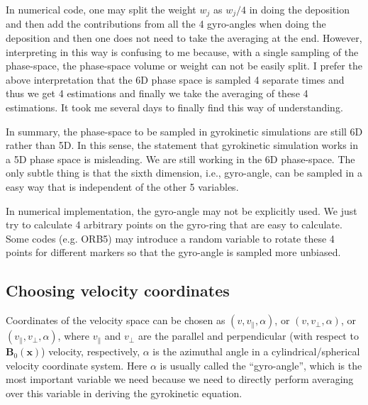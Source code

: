 \documentclass{article}
\begin{document}
In numerical code, one may split the weight $w_j$ as $w_j / 4$ in doing the
deposition and then add the contributions from all the 4 gyro-angles when
doing the deposition and then one does not need to take the averaging at the
end. However, interpreting in this way is confusing to me because, with a
single sampling of the phase-space, the phase-space volume or weight can not
be easily split. I prefer the above interpretation that the 6D phase space is
sampled 4 separate times and thus we get 4 estimations and finally we take the
averaging of these 4 estimations. It took me several days to finally find this
way of understanding.

In summary, the phase-space to be sampled in gyrokinetic simulations are still
6D rather than 5D. In this sense, the statement that gyrokinetic simulation
works in a 5D phase space is misleading. We are still working in the 6D
phase-space. The only subtle thing is that the sixth dimension, i.e.,
gyro-angle, can be sampled in a easy way that is independent of the other 5
variables.

In numerical implementation, the gyro-angle may not be explicitly used. We
just try to calculate 4 arbitrary points on the gyro-ring that are easy to
calculate. Some codes (e.g. ORB5) may introduce a random variable to rotate
these 4 points for different markers so that the gyro-angle is sampled more
unbiased.

\subsection{Choosing velocity coordinates}

Coordinates of the velocity space can be chosen as $(v, v_{\parallel},
\alpha)$, or $(v, v_{\perp}, \alpha)$, or $(v_{\parallel}, v_{\perp},
\alpha)$, where $v_{\parallel}$ and $v_{\perp}$ are the parallel and
perpendicular (with respect to $\mathbf{B}_0 (\mathbf{x})$) velocity,
respectively, $\alpha$ is the azimuthal angle in a cylindrical/spherical
velocity coordinate system. Here $\alpha$ is usually called the
``gyro-angle'', which is the most important variable we need because we need
to directly perform averaging over this variable in deriving the gyrokinetic
equation.
\end{document}
